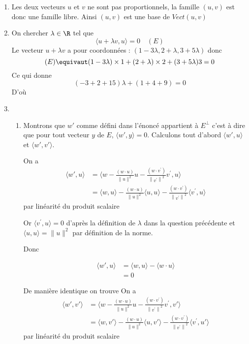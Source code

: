 \documentclass[a4paper, 11pt,reqno]{article}
\begin{document}
\begin{correction}
\begin{enumerate}
\item Les deux vecteurs $u$ et $v$ ne sont pas proportionnels, la famille $(u,v)$  est donc une famille libre. 
Ainsi $(u,v)$ est une base de $Vect(u,v)$
\item On chercher $\lambda \in \R$ tel que 
$$\langle u+\lambda v , u \rangle =0 \quad (E)$$ 
Le vecteur $u+\lambda v$ a pour coordonnées : $(1-3\lambda, 2+\lambda , 3+5 \lambda)$ donc 
$$(E)\equivaut (1-3\lambda)\times 1 + (2+\lambda) \times 2 + (3+5 \lambda ) 3 =0$$
Ce qui donne 
$$(-3+2+15)\lambda +(1+4+9)=0$$
D'où 


\item \begin{enumerate}
\item Montrons que $w'$ comme défini dans l'énoncé appartient à $E^\perp$ c'est à dire que pour tout vecteur $y$ de $E$, $\langle w', y \rangle =0$. 
Calculons tout d'abord 
$\langle w', u \rangle$ et $\langle w', v' \rangle$.

On a 
\begin{align*}
\langle w', u \rangle &=  \langle w-\frac{(w \cdot u)}{\|u\|^{2}} u-\frac{\left(w \cdot v^{\prime}\right)}{\left\|v^{\prime}\right\|^{2}} v^{\prime} , u \rangle\\
&= \langle w , u \rangle - \frac{(w \cdot u)}{\|u\|^{2}} \langle u , u \rangle - \frac{\left(w \cdot v^{\prime}\right)}{\left\|v^{\prime}\right\|^{2}}\langle v^{\prime} , u \rangle
\end{align*}
par linéarité du produit scalaire


Or $\langle v^{\prime} , u \rangle= 0$ d'après la définition de $\lambda $ dans la question précédente et $ \langle u , u \rangle =\|u\|^2$ par définition de la norme. 

Donc 

\begin{align*}
\langle w', u \rangle &= \langle w , u \rangle - \langle w \cdot u \rangle \\
&=0
\end{align*}

De manière identique on trouve 
On a 
\begin{align*}
\langle w', v' \rangle &=  \langle w-\frac{(w \cdot u)}{\|u\|^{2}} u-\frac{\left(w \cdot v^{\prime}\right)}{\left\|v^{\prime}\right\|^{2}} v^{\prime} , v' \rangle\\
&= \langle w , v' \rangle - \frac{(w \cdot u)}{\|u\|^{2}} \langle u , v' \rangle - \frac{\left(w \cdot v^{\prime}\right)}{\left\|v^{\prime}\right\|^{2}}\langle v^{\prime} , u' \rangle
\end{align*}
par linéarité du produit scalaire



\end{enumerate}
\end{enumerate}
\end{correction}
\end{document}
